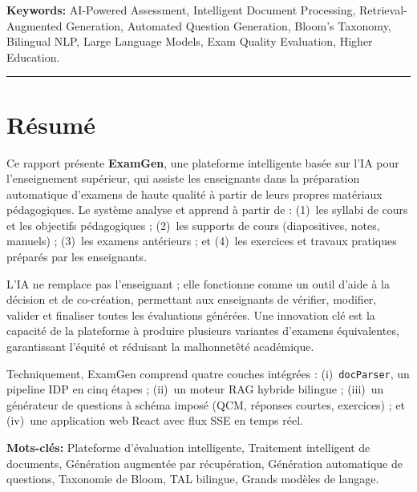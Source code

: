 \documentclass[12pt,a4paper]{article}
\begin{document}
\vspace{0.4cm}
\noindent\textbf{Keywords:} AI-Powered Assessment, Intelligent Document Processing,
Retrieval-Augmented Generation, Automated Question Generation, Bloom's Taxonomy,
Bilingual NLP, Large Language Models, Exam Quality Evaluation, Higher Education.

\vspace{0.4cm}
\hrule
\vspace{0.3cm}

\section*{R\'esum\'e}

Ce rapport pr\'esente \textbf{ExamGen}, une plateforme intelligente bas\'ee sur
l'IA pour l'enseignement sup\'erieur, qui assiste les enseignants dans la
pr\'eparation automatique d'examens de haute qualit\'e \`a partir de leurs propres
mat\'eriaux p\'edagogiques. Le syst\`eme analyse et apprend \`a partir de :
(1)~les syllabi de cours et les objectifs p\'edagogiques ; (2)~les supports de cours
(diapositives, notes, manuels) ; (3)~les examens ant\'erieurs ; et (4)~les exercices
et travaux pratiques pr\'epar\'es par les enseignants.

L'IA ne remplace pas l'enseignant ; elle fonctionne comme un outil d'aide \`a la
d\'ecision et de co-cr\'eation, permettant aux enseignants de v\'erifier, modifier,
valider et finaliser toutes les \'evaluations g\'en\'er\'ees. Une innovation cl\'e
est la capacit\'e de la plateforme \`a produire plusieurs variantes d'examens
\'equivalentes, garantissant l'\'equit\'e et r\'eduisant la malhonnet\^et\'e
acad\'emique.

Techniquement, ExamGen comprend quatre couches int\'egr\'ees : (i)~\texttt{docParser},
un pipeline IDP en cinq \'etapes ; (ii)~un moteur RAG hybride bilingue ;
(iii)~un g\'en\'erateur de questions \`a sch\'ema impos\'e (QCM, r\'eponses courtes,
exercices) ; et (iv)~une application web React avec flux SSE en temps r\'eel.

\vspace{0.3cm}
\noindent\textbf{Mots-cl\'es:} Plateforme d'\'evaluation intelligente, Traitement
intelligent de documents, G\'en\'eration augment\'ee par r\'ecup\'eration,
G\'en\'eration automatique de questions, Taxonomie de Bloom, TAL bilingue,
Grands mod\`eles de langage.
\end{document}
